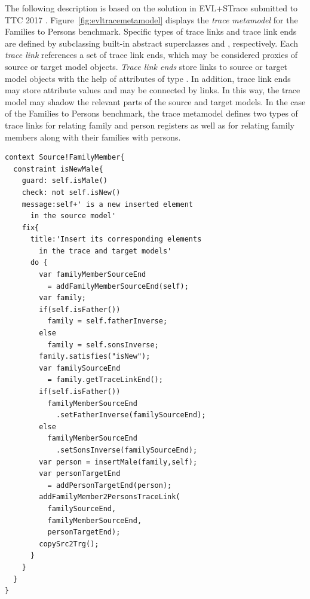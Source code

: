 The following description is based on the solution in EVL+STrace submitted to TTC 2017 \cite{Samimi-Dehkordi2017}.
Figure~\ref{fig:evltracemetamodel} displays the \emph{trace metamodel} for the Families to Persons benchmark. Specific types of trace links and trace link ends are defined by subclassing built-in abstract superclasses  and , respectively. Each \emph{trace link} references a set of trace link ends, which may be considered proxies of source or target model objects. \emph{Trace link ends} store links to source or target model objects with the help of attributes of type . In addition, trace link ends may store attribute values and may be connected by links. In this way, the trace model may shadow the relevant parts of the source and target models. In the case of the Families to Persons benchmark, the trace metamodel defines two types of trace links for relating family and person registers as well as for relating family members along with their families with persons.


 


\begin{lstlisting}[label={lst:evl}, float=htb!, language=evl, caption={Example of an EVL constraint}]
context Source!FamilyMember{
  constraint isNewMale{
    guard: self.isMale()
    check: not self.isNew()
    message:self+' is a new inserted element 
      in the source model'
    fix{
      title:'Insert its corresponding elements 
        in the trace and target models'
      do {
        var familyMemberSourceEnd 
          = addFamilyMemberSourceEnd(self);
        var family;
        if(self.isFather()) 
          family = self.fatherInverse;
        else 
          family = self.sonsInverse;
        family.satisfies("isNew");
        var familySourceEnd 
          = family.getTraceLinkEnd(); 
        if(self.isFather()) 
          familyMemberSourceEnd
            .setFatherInverse(familySourceEnd);			
        else 
          familyMemberSourceEnd
            .setSonsInverse(familySourceEnd);			
        var person = insertMale(family,self);
        var personTargetEnd 
          = addPersonTargetEnd(person);
        addFamilyMember2PersonsTraceLink(
          familySourceEnd, 
          familyMemberSourceEnd, 
          personTargetEnd);
        copySrc2Trg();
      }
    }
  }
}
\end{lstlisting}

